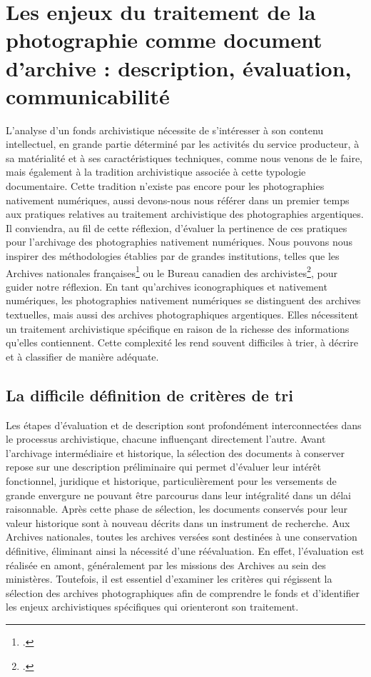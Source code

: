 \chapter{Les enjeux du traitement de la photographie comme document d'archive : description, évaluation, communicabilité}
\label{sec:chap3}
L'analyse d'un fonds archivistique nécessite de s'intéresser à son contenu intellectuel, en grande partie déterminé par les activités du service producteur, à sa matérialité et à ses caractéristiques techniques, comme nous venons de le faire, mais également à la tradition archivistique associée à cette typologie documentaire. Cette tradition n'existe pas encore pour les photographies nativement numériques, aussi devons-nous nous référer dans un premier temps aux pratiques relatives au traitement archivistique des photographies argentiques. Il conviendra, au fil de cette réflexion, d'évaluer la pertinence de ces pratiques pour l'archivage des photographies nativement numériques. Nous pouvons nous inspirer des méthodologies établies par de grandes institutions, telles que les Archives nationales françaises\footcite{missionphotographiqueDescriptionDocumentsPhotographiques2019} ou le Bureau canadien des archivistes\footcite{bureaucanadiendesarchivistesReglesPourDescription1990}, pour guider notre réflexion. En tant qu'archives iconographiques et nativement numériques, les photographies nativement numériques se distinguent des archives textuelles, mais aussi des archives photographiques argentiques. Elles nécessitent un traitement archivistique spécifique en raison de la richesse des informations qu'elles contiennent. Cette complexité les rend souvent difficiles à trier, à décrire et à classifier de manière adéquate.

\section{La difficile définition de critères de tri}

Les étapes d’évaluation et de description sont profondément interconnectées dans le processus archivistique, chacune influençant directement l'autre. Avant l'archivage intermédiaire et historique, la sélection des documents à conserver repose sur une description préliminaire qui permet d'évaluer leur intérêt fonctionnel, juridique et historique, particulièrement pour les versements de grande envergure ne pouvant être parcourus dans leur intégralité dans un délai raisonnable. Après cette phase de sélection, les documents conservés pour leur valeur historique sont à nouveau décrits dans un instrument de recherche. Aux Archives nationales, toutes les archives versées sont destinées à une conservation définitive, éliminant ainsi la nécessité d'une réévaluation. En effet, l'évaluation est réalisée en amont, généralement par les missions des Archives au sein des ministères. Toutefois, il est essentiel d'examiner les critères qui régissent la sélection des archives photographiques afin de comprendre le fonds et d'identifier les enjeux archivistiques spécifiques qui orienteront son traitement.


